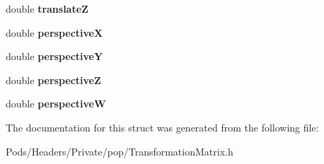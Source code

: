 \begin{DoxyCompactItemize}
double {\bfseries translateZ}
\item 
\mbox{\label{struct_web_core_1_1_transformation_matrix_1_1_decomposed_type_a56c48b3bb87ade5ad5cef8a510e94b68}} 
double {\bfseries perspectiveX}
\item 
\mbox{\label{struct_web_core_1_1_transformation_matrix_1_1_decomposed_type_abf6a0e878e47a9cc744b773fe42f320b}} 
double {\bfseries perspectiveY}
\item 
\mbox{\label{struct_web_core_1_1_transformation_matrix_1_1_decomposed_type_a7f8341bc29a34a9df6e23eb99d351fb6}} 
double {\bfseries perspectiveZ}
\item 
\mbox{\label{struct_web_core_1_1_transformation_matrix_1_1_decomposed_type_a3deef5f96177e8d3f749ca1ef24a136b}} 
double {\bfseries perspectiveW}
\end{DoxyCompactItemize}


The documentation for this struct was generated from the following file\+:\begin{DoxyCompactItemize}
\item 
Pods/\+Headers/\+Private/pop/Transformation\+Matrix.\+h\end{DoxyCompactItemize}
